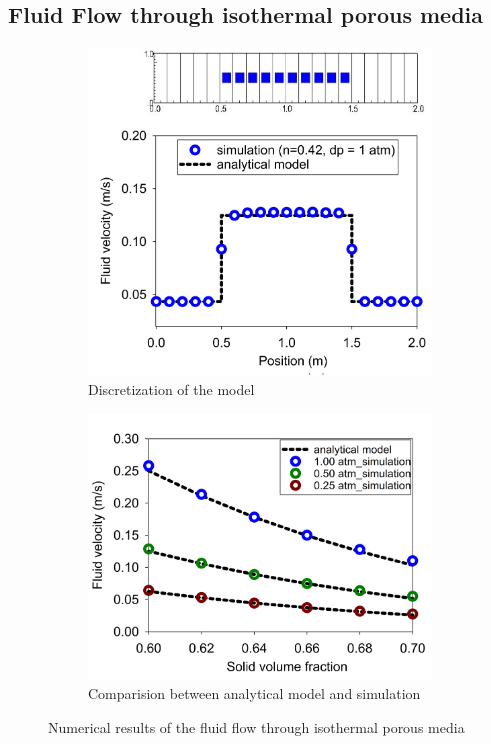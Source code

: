 \documentclass[preprint,12pt]{elsarticle}
\begin{document}
\subsection{\textsf{Fluid Flow through isothermal porous media}}
%
%
\begin{figure}[h]
\center
\begin{subfigure}[c]{0.5\linewidth}
\includegraphics[width=\linewidth]{porousflow1.jpg}
\caption{Discretization of the model}
\label{fig:3c}
\end {subfigure}\hfill    
\begin{subfigure}[d]{0.5\linewidth}
\includegraphics[width=\linewidth]{porousflow.jpg}
\caption{Comparision between analytical model and simulation}
\label{fig:3d}
\end {subfigure}
\caption{Numerical results of the fluid flow through isothermal porous media}
\label{fig:porousflow}
\end {figure}
\end{document}
